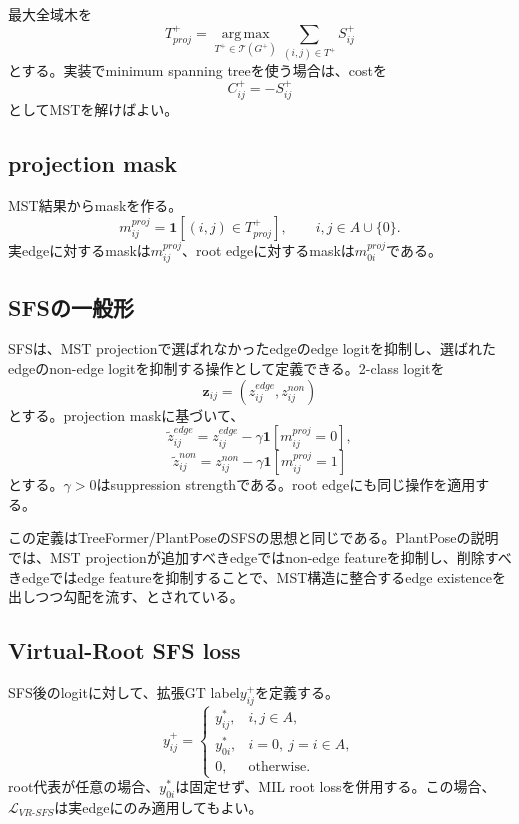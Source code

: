 \documentclass[11pt,a4paper]{article}
\newcommand{\one}{\mathbf{1}}
\newcommand{\argmax}{\operatorname*{arg\,max}}
\begin{document}
最大全域木を
\begin{equation}
  T^{+}_{proj}=\argmax_{T^+\in\mathcal{T}(G^+)}\sum_{(i,j)\in T^+}S^+_{ij}
\end{equation}
とする。実装でminimum spanning treeを使う場合は、costを
\begin{equation}
  C^+_{ij}=-S^+_{ij}
\end{equation}
としてMSTを解けばよい。

\subsection{projection mask}
MST結果からmaskを作る。
\begin{equation}
  m^{proj}_{ij}=\one[(i,j)\in T^{+}_{proj}],
  \qquad i,j\in A\cup\{0\}.
\end{equation}
実edgeに対するmaskは$m^{proj}_{ij}$、root edgeに対するmaskは$m^{proj}_{0i}$である。

\subsection{SFSの一般形}
SFSは、MST projectionで選ばれなかったedgeのedge logitを抑制し、選ばれたedgeのnon-edge logitを抑制する操作として定義できる。2-class logitを
\begin{equation}
  \bm{z}_{ij}=(z_{ij}^{edge},z_{ij}^{non})
\end{equation}
とする。projection maskに基づいて、
\begin{equation}
  \tilde{z}_{ij}^{edge}=z_{ij}^{edge}-\gamma\one[m^{proj}_{ij}=0],
\end{equation}
\begin{equation}
  \tilde{z}_{ij}^{non}=z_{ij}^{non}-\gamma\one[m^{proj}_{ij}=1]
\end{equation}
とする。$\gamma>0$はsuppression strengthである。root edgeにも同じ操作を適用する。

この定義はTreeFormer/PlantPoseのSFSの思想と同じである。PlantPoseの説明では、MST projectionが追加すべきedgeではnon-edge featureを抑制し、削除すべきedgeではedge featureを抑制することで、MST構造に整合するedge existenceを出しつつ勾配を流す、とされている\cite{plantpose2026}。

\subsection{Virtual-Root SFS loss}
SFS後のlogitに対して、拡張GT label$y^+_{ij}$を定義する。
\begin{equation}
  y^+_{ij}=\begin{cases}
    y^*_{ij}, & i,j\in A, \\
    y^*_{0i}, & i=0,\ j=i\in A, \\
    0, & \text{otherwise}.
  \end{cases}
\end{equation}
root代表が任意の場合、$y^*_{0i}$は固定せず、MIL root lossを併用する。この場合、$\mathcal{L}_{VR\text{-}SFS}$は実edgeにのみ適用してもよい。
\end{document}

